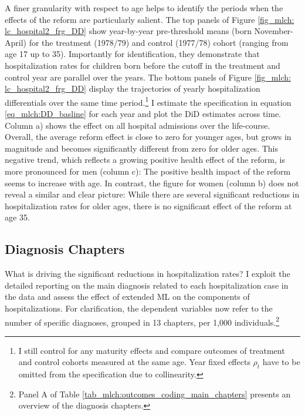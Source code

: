 A finer granularity with respect to age helps to identify the periods when the effects of the reform are particularly salient. The top panels of Figure \ref{fig_mlch: lc_hospital2_frg_DD} show year-by-year pre-threshold means (born November-April) for the treatment (1978/79) and control (1977/78) cohort (ranging from age 17 up to 35). Importantly for identification, they demonstrate that hospitalization rates for children born before the cutoff in the treatment and control year are parallel over the years. The bottom panels of Figure \ref{fig_mlch: lc_hospital2_frg_DD} display the trajectories of yearly hospitalization differentials over the same time period.\footnote{I still control for any maturity effects and compare outcomes of treatment and control cohorts measured at the same age. Year fixed effects $\rho_t$ have to be omitted from the specification due to collinearity.} I estimate the specification in equation \ref{eq_mlch:DD_basline} for each year and plot the DiD estimates across time. Column a) shows the effect on all hospital admissions over the life-course. Overall, the average reform effect is close to zero for younger ages, but grows in magnitude and becomes significantly different from zero for older ages. This negative trend, which reflects a growing positive health effect of the reform, is more pronounced for men (column c): The positive health impact of the reform seems to increase with age. In contrast, the figure for women (column b) does not reveal a similar and clear picture: While there are several significant reductions in hospitalization rates for older ages, there is no significant effect of the reform at age 35.



\bigskip
\subsection{Diagnosis Chapters}

What is driving the significant reductions in hospitalization rates? I exploit the detailed reporting on the main diagnosis related to each hospitalization case in the data and assess the effect of extended ML on the components of hospitalizations. For clarification, the dependent variables now refer to the number of specific diagnoses, grouped in 13 chapters, per 1,000 individuals.\footnote{Panel A of Table \ref{tab_mlch:outcomes_coding_main_chapters} presents an overview of the diagnosis chapters.} 

